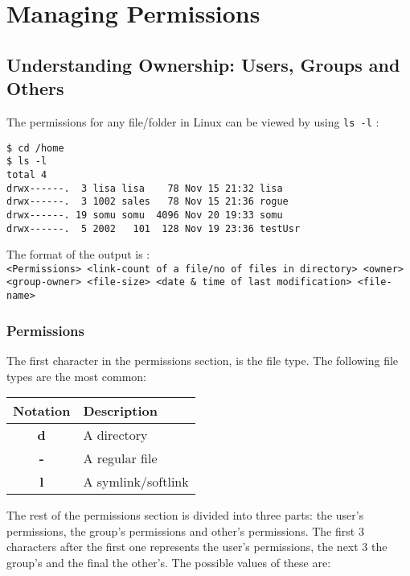 \chapter{Managing Permissions}
\section{Understanding Ownership: Users, Groups and Others}
The permissions for any file/folder in Linux can be viewed by using \verb|ls -l| :

\vspace{-15pt}
\begin{verbatim}
$ cd /home
$ ls -l
total 4
drwx------.  3 lisa lisa    78 Nov 15 21:32 lisa
drwx------.  3 1002 sales   78 Nov 15 21:36 rogue
drwx------. 19 somu somu  4096 Nov 20 19:33 somu
drwx------.  5 2002   101  128 Nov 19 23:36 testUsr
\end{verbatim}
\vspace{-10pt}

\noindent
The format of the output is : \\
\verb|<Permissions> <link-count of a file/no of files in directory> <owner>| \\
\verb|<group-owner> <file-size> <date & time of last modification> <file-name>|

\subsection{Permissions}
The first character in the permissions section, is the file type. The following file types are the most common:

\vspace{-15pt}
\begin{center}
	\begin{tabular}{cl}
		\toprule
		\textbf{Notation} &\textbf{Description} \\
		\midrule
		\textbf{d}	&A directory \\
		\textbf{-}	&A regular file \\
		\textbf{l}	&A symlink/softlink \\
		\bottomrule
	\end{tabular}
\end{center}

\noindent
The rest of the permissions section is divided into three parts: the user's permissions, the group's permissions and other's permissions. The first 3 characters after the first one represents the user's permissions, the next 3 the group's and the final the other's. The possible values of these are:


